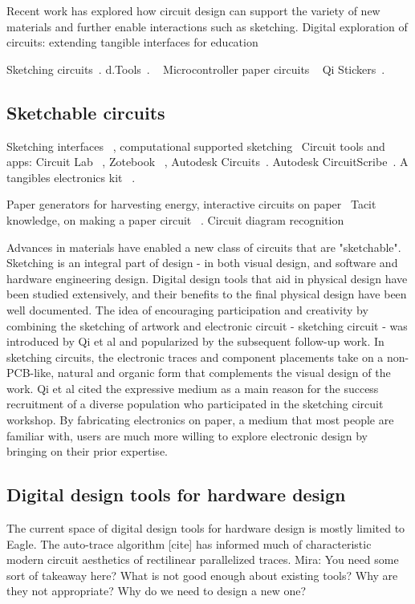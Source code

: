 \documentclass{sigchi}
\begin{document}
Recent work has explored how circuit design can support the variety of new materials and further enable interactions such as sketching. 
Digital exploration of circuits: extending tangible interfaces for education 

Sketching circuits~\cite{qi_sketching_2014}. 
d.Tools~\cite{hartmann_reflective_2006}. ~\cite{savage_midas:_2012} Microcontroller paper circuits ~\cite{mellis_microcontrollers_2013} 
Qi Stickers~\cite{qi_stickers_2015}.
\subsection{Sketchable circuits}

Sketching interfaces ~\cite{jorge_sketch-based_2011}, computational supported sketching~\cite{johnson_computational_2009} 
Circuit tools and apps: Circuit Lab~\cite{_circuitlab_????} , Zotebook ~\cite{_zotebook_????}, Autodesk Circuits~\cite{_autodesk123d_????}. Autodesk CircuitScribe~\cite{_autodesk_????}. 
A tangibles electronics kit ~\cite{baafi_toolkit_2011}. 

Paper generators for harvesting energy, interactive circuits on paper~\cite{karagozler_paper_2013} 
Tacit knowledge, on making a paper circuit ~\cite{shorter_practical_2014}.
Circuit diagram recognition~\cite{feng_-line_2009} 

Advances in materials have enabled a new class of circuits that are "sketchable". Sketching is an integral part of design - in both visual design, and software and hardware engineering design. Digital design tools that aid in physical design have been studied extensively, and their benefits to the final physical design have been well documented. The idea of encouraging participation and creativity by combining the sketching of artwork and electronic circuit - sketching circuit - was introduced by Qi et al and popularized by the subsequent follow-up work. In sketching circuits, the electronic traces and component placements take on a non-PCB-like, natural and organic form that complements the visual design of the work. Qi et al cited the expressive medium as a main reason for the success recruitment of a diverse population who participated in the sketching circuit workshop. By fabricating electronics on paper, a medium that most people are familiar with, users are much more willing to explore electronic design by bringing on their prior expertise.  

\subsection{Digital design tools for hardware design }
The current space of digital design tools for hardware design is mostly limited to Eagle. The auto-trace algorithm [cite] has informed much of characteristic modern circuit aesthetics of rectilinear parallelized traces. Mira: You need some sort of takeaway here? What is not good enough about existing tools? Why are they not appropriate? Why do we need to design a new one?
\end{document}
